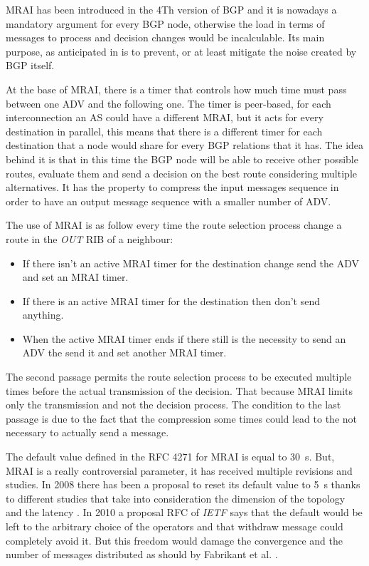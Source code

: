 \ac{MRAI} has been introduced in the \num{4}Th version of \ac{BGP} \cite{rfc4271} and
it is nowadays a mandatory argument for every \ac{BGP} node, otherwise the load
in terms of messages to process and decision changes would be incalculable.
Its main purpose, as anticipated in  is to prevent, or
at least mitigate the noise created by \ac{BGP} itself.

At the base of \ac{MRAI}, there is a timer that controls how much time must pass
between one \ac{ADV} and the following one.
The timer is peer-based, for each interconnection an \ac{AS} could have a different
\ac{MRAI}, but it acts for every destination in parallel, this means that there 
is a different timer for each destination that a node would share for every 
\ac{BGP} relations that it has.
The idea behind it is that in this time the \ac{BGP} node will be able
to receive other possible routes, evaluate them and send a decision on the 
best route considering multiple alternatives.
It has the property to compress the input messages sequence in order to have
an output message sequence with a smaller number of \ac{ADV}.

The use of \ac{MRAI} is as follow every time the route selection process change
a route in the \textit{OUT} \ac{RIB} of a neighbour:
\begin{itemize}
	\item If there isn't an active \ac{MRAI} timer for the destination change
		send the \ac{ADV} and set an \ac{MRAI} timer.
	\item If there is an active \ac{MRAI} timer for the destination then 
		don't send anything.
	\item When the active \ac{MRAI} timer ends if there still is the necessity
		to send an \ac{ADV} the send it and set another \ac{MRAI} timer.
\end{itemize}

The second passage permits the route selection process to be executed multiple
times before the actual transmission of the decision.
That because \ac{MRAI} limits only the transmission and not the decision process.
The condition to the last passage is due to the fact that the compression some
times could lead to the not necessary to actually send a message.

The default value defined in the \ac{RFC} \num{4271} for \ac{MRAI} is equal to
\SI{30}{\second}.
But, \ac{MRAI} is a really controversial parameter, it has received multiple
revisions and studies.
In \num{2008} there has been a proposal to reset its default value to \SI{5}{\second}
\cite{jakma2008revised} thanks to different studies that take into consideration
the dimension of the topology and the latency \cite{qiu2005optimal}.
In \num{2010} a proposal \ac{RFC} of \textit{IETF} \cite{jakma2010revisions} 
says that the default would be left to the arbitrary choice of the operators and
that withdraw message could completely avoid it.
But this freedom would damage the convergence and the number of messages distributed
as should by Fabrikant et al. \cite{fabrikant2011there}.

